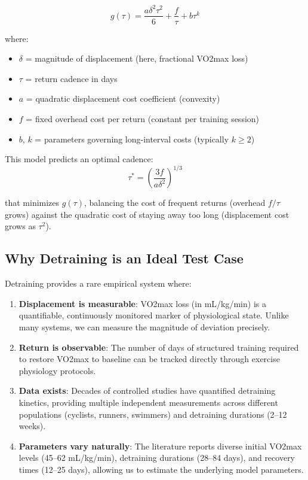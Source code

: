 \documentclass[12pt,a4paper]{article}
\begin{document}
\begin{equation}
g(\tau) = \frac{a\delta^2\tau^2}{6} + \frac{f}{\tau} + b\tau^k
\end{equation}

where:
\begin{itemize}
\item $\delta$ = magnitude of displacement (here, fractional VO2max loss)
\item $\tau$ = return cadence in days
\item $a$ = quadratic displacement cost coefficient (convexity)
\item $f$ = fixed overhead cost per return (constant per training session)
\item $b$, $k$ = parameters governing long-interval costs (typically $k \geq 2$)
\end{itemize}

This model predicts an optimal cadence:
\begin{equation}
\tau^* = \left(\frac{3f}{a\delta^2}\right)^{1/3}
\end{equation}

that minimizes $g(\tau)$, balancing the cost of frequent returns (overhead $f/\tau$ grows) against the quadratic cost of staying away too long (displacement cost grows as $\tau^2$).

\subsection{Why Detraining is an Ideal Test Case}

Detraining provides a rare empirical system where:
\begin{enumerate}
\item \textbf{Displacement is measurable}: VO2max loss (in mL/kg/min) is a quantifiable, continuously monitored marker of physiological state. Unlike many systems, we can measure the magnitude of deviation precisely.

\item \textbf{Return is observable}: The number of days of structured training required to restore VO2max to baseline can be tracked directly through exercise physiology protocols.

\item \textbf{Data exists}: Decades of controlled studies have quantified detraining kinetics, providing multiple independent measurements across different populations (cyclists, runners, swimmers) and detraining durations (2--12 weeks).

\item \textbf{Parameters vary naturally}: The literature reports diverse initial VO2max levels (45--62 mL/kg/min), detraining durations (28--84 days), and recovery times (12--25 days), allowing us to estimate the underlying model parameters.
\end{enumerate}
\end{document}
